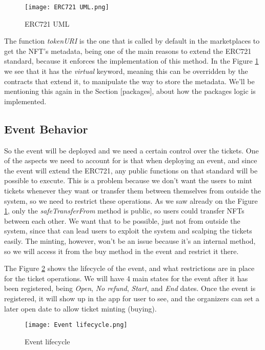 \begin{figure}[H]
    \texttt{[image: ERC721 UML.png]}
    \centering
    \caption{ERC721 UML}
    \label{fig:erc721_uml}
\end{figure}

The function \textit{tokenURI} is the one that is called by default in the marketplaces to get the NFT's metadata, being one of the main reasons to extend the ERC721 standard, because it enforces the implementation of this method. In the Figure \ref{fig:erc721_uml} we see that it has the \textit{virtual} keyword, meaning this can be overridden by the contracts that extend it, to manipulate the way to store the metadata. We'll be mentioning this again in the Section [packages], about how the packages logic is implemented.

\subsection{Event Behavior}
\label{subsec:event_behavior}

So the event will be deployed and we need a certain control over the tickets. One of the aspects we need to account for is that when deploying an event, and since the event will extend the ERC721, any public functions on that standard will be possible to execute. This is a problem because we don't want the users to mint tickets whenever they want or transfer them between themselves from outside the system, so we need to restrict these operations. As we saw already on the Figure \ref{fig:erc721_uml}, only the \textit{safeTransferFrom} method is public, so users could transfer NFTs between each other. We want that to be possible, just not from outside the system, since that can lead users to exploit the system and scalping the tickets easily. The minting, however, won't be an issue because it's an internal method, so we will access it from the buy method in the event and restrict it there.

The Figure \ref{fig:event_lifecycle} shows the lifecycle of the event, and what restrictions are in place for the ticket operations. We will have 4 main states for the event after it has been registered, being \textit{Open}, \textit{No refund}, \textit{Start}, and \textit{End} dates. Once the event is registered, it will show up in the app for user to see, and the organizers can set a later open date to allow ticket minting (buying).

\begin{figure}[H]
    \texttt{[image: Event lifecycle.png]}
    \centering
    \caption{Event lifecycle}
    \label{fig:event_lifecycle}
\end{figure}

